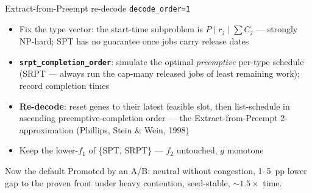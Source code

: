 \documentclass[aspectratio=169,t]{beamer}
\newcommand{\code}[1]{\texttt{#1}}
\newcommand{\g}{\ensuremath{g}\xspace}
\begin{document}
\begin{frame}{Extract-from-Preempt re-decode \hfill{\small\code{decode\_order=1}}}
  \begin{itemize}
    \item Fix the type vector: the start-time subproblem is
      $P \mid r_j \mid \sum C_j$ --- strongly NP-hard; SPT has no guarantee
      once jobs carry release dates
    \item \textbf{\code{srpt\_completion\_order}}: simulate the optimal
      \emph{preemptive} per-type schedule (SRPT --- always run the cap-many
      released jobs of least remaining work); record completion times
    \item \textbf{Re-decode}: reset genes to their latest feasible slot, then
      list-schedule in ascending preemptive-completion order --- the
      \alert{Extract-from-Preempt} 2-approximation (Phillips, Stein \& Wein, 1998)
    \item Keep the lower-$f_1$ of \{SPT, SRPT\} --- $f_2$ untouched, \g monotone
  \end{itemize}
  \begin{block}{Now the default}
    Promoted by an A/B: neutral without congestion, 1--5~pp lower gap to the
    proven front under heavy contention, seed-stable, $\sim\!1.5\times$ time.
  \end{block}
\end{frame}
\end{document}
